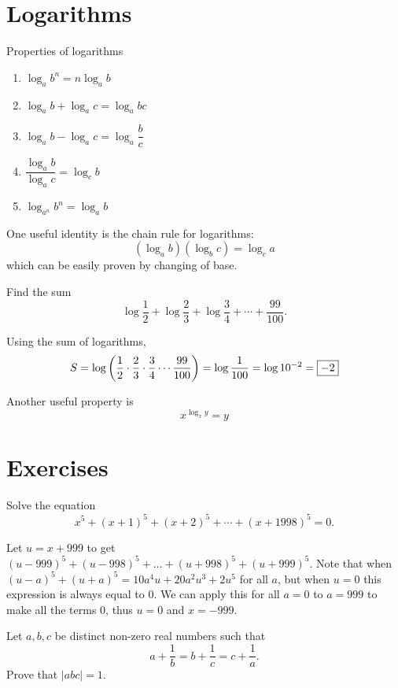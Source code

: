 \section{Logarithms}
Properties of logarithms
\begin{enumerate}
\item $\log_ab^n=n\log_ab$
\item $\log_ab+\log_ac=\log_abc$
\item $\log_ab-\log_ac=\log_a\dfrac{b}{c}$
\item $\dfrac{\log_ab}{\log_ac}=\log_cb$
\item $\log_{a^n}b^n=\log_ab$
\end{enumerate}

One useful identity is the chain rule for logarithms:
\[ (\log_ab)(\log_bc)=\log_ca \]
which can be easily proven by changing of base.

\begin{exercise}
Find the sum
\[ \log\frac{1}{2}+\log\frac{2}{3}+\log\frac{3}{4}+\cdots+\frac{99}{100}. \]
\end{exercise}
\begin{solution}
Using the sum of logarithms,
\[ S=\log\left(\frac{1}{2}\cdot\frac{2}{3}\cdot\frac{3}{4}\cdots\frac{99}{100}\right)=\log\frac{1}{100}=\log10^{-2}=\boxed{-2} \]
\end{solution}

Another useful property is 
\[ x^{\log_xy}=y \]
\pagebreak

\section*{Exercises}
\begin{prbm}
Solve the equation
\[ x^5+(x+1)^5+(x+2)^5+\cdots+(x+1998)^5=0. \]
\end{prbm}

\begin{solution}
Let $u=x+999$ to get $(u-999)^5+(u-998)^5+ \dots + (u+998)^5+(u+999)^5$. Note that when $(u-a)^5+(u+a)^5=10 a^4 u + 20 a^2 u^3 + 2 u^5$ for all $a$, but when $u=0$ this expression is always equal to $0$. We can apply this for all $a=0$ to $a=999$ to make all the terms $0$, thus $u=0$ and $\boxed{x=-999}$.
\end{solution}

\begin{prbm}
Let $a, b, c$ be distinct non-zero real numbers such that
\[ a+\frac{1}{b}=b+\frac{1}{c}=c+\frac{1}{a}. \]
Prove that $|abc|=1$.
\end{prbm}

